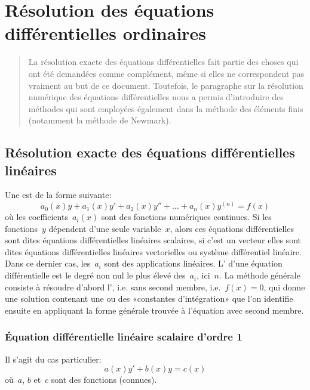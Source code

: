 \chapter{Résolution des équations différentielles ordinaires}\label{Ch-ED} 

\begin{abstract}
La résolution exacte des équations différentielles fait partie des choses qui ont été demandées comme complément, même si elles ne correspondent pas vraiment au but de ce document. Toutefois, le paragraphe sur la résolution numérique des équations différentielles nous a permis d'introduire des méthodes qui sont employées également dans la méthode des éléments finis (notamment la méthode de Newmark). 
\end{abstract} 

\section{Résolution exacte des équations différentielles linéaires} 

Une  est de la forme suivante:
\begin{equation}
a_0(x) y + a_1(x) y' + a_2(x) y'' + \ldots + a_n(x) y^{(n)}= f(x)
\end{equation}
où les coefficients~$a_i(x)$ sont des fonctions numériques continues. Si les fonctions~$y$ dépendent d'une seule variable~$x$, alors ces équations différentielles sont dites équations différentielles linéaires scalaires, si c'est un vecteur elles sont dites équations différentielles linéaires vectorielles ou système différentiel linéaire. Dans ce dernier cas, les~$a_i$ sont des applications linéaires. L' d'une équation différentielle est le degré non nul le plus élevé des~$a_i$, ici~$n$. 
La méthode générale consiste à résoudre d'abord l', i.e. sans second membre, i.e.~$f(x)=0$, qui donne une solution contenant une ou des «constantes d'intégration» que l'on identifie ensuite en appliquant la forme générale trouvée à l'équation avec second membre. 
 
\medskip
\subsection{Équation différentielle linéaire scalaire d'ordre 1} 

Il s'agit du cas particulier:
\begin{equation}
a(x)y' + b(x)y = c(x)
\end{equation}
où~$a$, $b$ et~$c$ sont des fonctions (connues). 

